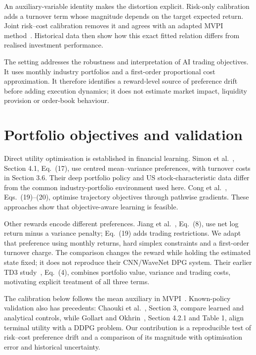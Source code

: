 \documentclass[sigconf,anonymous,review]{acmart}
\begin{document}
An auxiliary-variable identity makes the distortion explicit. Risk-only calibration adds a turnover term whose magnitude depends on the target expected return. Joint risk--cost calibration removes it and agrees with an adapted MVPI method\ \cite{zhang2021}. Historical data then show how this exact fitted relation differs from realised investment performance.

The setting addresses the robustness and interpretation of AI trading objectives. It uses monthly industry portfolios and a first-order proportional cost approximation. It therefore identifies a reward-level source of preference drift before adding execution dynamics; it does not estimate market impact, liquidity provision or order-book behaviour.

\section{Portfolio objectives and validation}
Direct utility optimisation is established in financial learning. Simon et al.\ \cite{simon2026}, Section 4.1, Eq.\ (17), use centred mean--variance preferences, with turnover costs in Section 3.6. Their deep portfolio policy and US stock-characteristic data differ from the common industry-portfolio environment used here. Cong et al.\ \cite{cong2026}, Eqs.\ (19)--(20), optimise trajectory objectives through pathwise gradients. These approaches show that objective-aware learning is feasible.

Other rewards encode different preferences. Jiang et al.\ \cite{jiang2025}, Eq.\ (8), use net log return minus a variance penalty; Eq.\ (19) adds trading restrictions. We adapt that preference using monthly returns, hard simplex constraints and a first-order turnover charge. The comparison changes the reward while holding the estimated state fixed; it does not reproduce their CNN/WaveNet DPG system. Their earlier TD3 study\ \cite{jiang2024}, Eq.\ (4), combines portfolio value, variance and trading costs, motivating explicit treatment of all three terms.

The calibration below follows the mean auxiliary in MVPI\ \cite{zhang2021}. Known-policy validation also has precedents: Chaouki et al.\ \cite{chaouki2020}, Section 3, compare learned and analytical controls, while Gollart and Okhrin\ \cite{gollart2025}, Section 4.2.1 and Table 1, align terminal utility with a DDPG problem. Our contribution is a reproducible test of risk--cost preference drift and a comparison of its magnitude with optimisation error and historical uncertainty.
\end{document}
